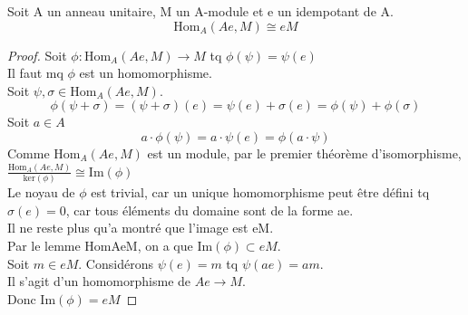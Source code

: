 \begin{lemma}[HomAeMisoeM']
    \label{HomAeMisoeM'}
    Soit A un anneau unitaire, M un A-module et e un idempotant de A.
    \[ \text{Hom}_{A}(A e,M) \cong e M\]
\end{lemma}
\begin{proof}
    Soit $\phi : \text{Hom}_{A}(A e,M) \to M$ tq $\phi(\psi) = \psi(e)$\\
    Il faut mq $\phi$ est un homomorphisme.\\
    Soit $\psi , \sigma \in \text{Hom}_{A}(A e,M)$.\\
    \[ \phi(\psi + \sigma) = (\psi + \sigma)(e) = \psi(e) + \sigma(e) = \phi(\psi) + \phi(\sigma) \]
    Soit $a \in A$
    \[ a \cdot \phi(\psi) = a \cdot \psi(e) = \phi(a \cdot \psi) \]
    Comme $\text{Hom}_{A}(A e,M)$ est un module, par le premier théorème d'isomorphisme, \\
    $\frac{\text{Hom}_{A}(A e,M)}{\text{ker}(\phi)} \cong \text{Im}(\phi)$\\
    Le noyau de $\phi$ est trivial, car un unique homomorphisme peut être défini tq $\sigma(e) = 0$, car tous éléments du domaine sont de la forme ae.\\
    Il ne reste plus qu'a montré que l'image est eM.\\
    Par le lemme HomAeM, on a que $\text{Im}(\phi) \subset e M$.\\
    Soit $m \in e M$. Considérons $\psi(e)=m$ tq $\psi(ae) = am$.\\
    Il s'agit d'un homomorphisme de $A e \to M$.\\
    Donc $\text{Im}(\phi) = e M$
\end{proof}